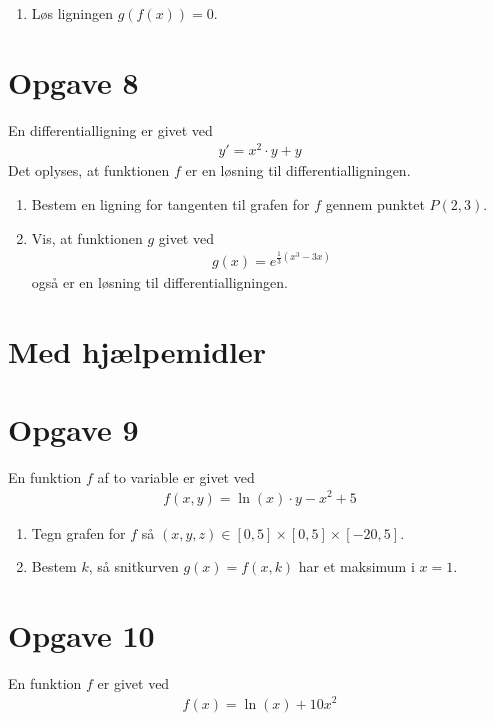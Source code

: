 \begin{enumerate}[label=\roman*)]
	\item Løs ligningen $g(f(x)) = 0$.
\end{enumerate}

\section*{Opgave 8}
En differentialligning er givet ved
	\begin{align*}
		y' = x^2\cdot y + y
	\end{align*}
	Det oplyses, at funktionen $f$ er en løsning til differentialligningen.
\begin{enumerate}[label=\roman*)]
	\item Bestem en ligning for tangenten til grafen for $f$ gennem punktet $P(2,3)$.
	\item Vis, at funktionen $g$ givet ved 
	\begin{align*}
		g(x) = e^{\frac{1}{3}(x^3-3x)}
	\end{align*}
	også er en løsning til differentialligningen.
\end{enumerate}

\newpage
\section*{Med hjælpemidler}
\section*{Opgave 9}

En funktion $f$ af to variable er givet ved
\begin{align*}
	f(x,y) = \ln(x)\cdot y - x^2 + 5
\end{align*}
\begin{enumerate}[label=\roman*)]
	\item Tegn grafen for $f$ så $(x,y,z)\in [0,5]\times [0,5]\times [-20,5]$.
	\item Bestem $k$, så snitkurven $g(x) = f(x,k)$ har et maksimum i $x=1$. 
\end{enumerate}

\section*{Opgave 10}

En funktion $f$ er givet ved
	\begin{align*}
		f(x) = \ln(x)+10x^2
	\end{align*}
	
